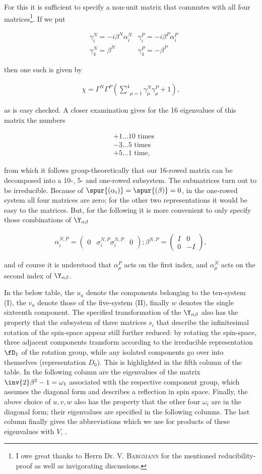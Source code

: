 \documentclass{article}
\newcommand{\uequ}[1]{
\begin{align*}
#1
\end{align*}
}
\newcommand{\sumXY}[2]{\underset{#1}{\overset{#2}{\sum}}}
\begin{document}
For this it is sufficient to specify a non-unit matrix that commutes with all four matrices\footnote{I owe great thanks to Herrn Dr. \textsc{V. Bargmann} for the mentioned reducibility-proof as well as invigorating discussions.}. If we put
\uequ{
& \gamma^N_i = -i\beta^N \alpha^N_i & \gamma^P_i = -i\beta^P\alpha^P_i\\
& \gamma^N_4 = \beta^N & \gamma^P_4 = -\beta^P
}
then one such is given by
\uequ{
\chi = \Gamma^N \Gamma^P\left(\sumXY{\mu=1}{4}{\gamma^N_\mu\gamma^P_\mu + 1}\right),
}
as is easy checked. A closer examination gives for the 16 eigenvalues of this matrix the numbers
\uequ{ 
&+1\dots 10\text{ times}\\
&-3\dots 5\text{ times}\\
&+5\dots 1\text{ time},
}
from which it follows group-theoretically that our 16-rowed matrix can be decomposed into a 10-, 5- and one-rowed subsystem. The submatrices turn out to be irreducible. Because of $\spur{(\alpha_i)} = \spur{(\beta)} = 0$, in the one-rowed system all four matrices are zero; for the other two representations it would be easy to  the matrices. But, for the following it is more convenient to only specify those combinations of $\Y_{\alpha\beta}$ 
\uequ{
\alpha^{N,P}_i = \left(\begin{matrix}
0 & \sigma^{N,P}_i
\sigma^{N,P}_i & 0
\end{matrix}
\right); \beta^{N,P} = \left(\begin{matrix}
I & 0\\
0 & -I
\end{matrix}\right),
}
and of course it is understood that $\alpha^P_\mu$ acts on the first index, and $\alpha^N_\mu$ acts on the second index of $\Y_{\alpha\beta}$.

In the below table, the $u_a$ denote the components belonging to the ten-system (I), the $v_a$ denote those of the five-system (II), finally $w$ denotes the single sixteenth component. The specified transformation of the $\Y_{\alpha\beta}$ also has the property that the subsystem of three matrices $s_i$ that describe the infinitesimal rotation of the spin-space appear still further reduced: by rotating the spin-space, three adjacent components transform according to the irreducible representation $\fD_1$ of the rotation group, while any isolated components go over into themselves (representation $D_0$). This is highlighted in the fifth column of the table. In the following column are the eigenvalues of the matrix $\inv{2}\beta^2 - 1 = \omega_1$ associated with the respective component group, which assumes the diagonal form and describes a reflection in spin space. Finally, the above choice of $u,v,w$ also has the property that the other four $\omega_i$ are in the diagonal form; their eigenvalues are specified in the following columns. The last column finally gives the abbreviations which we use for products of these eigenvalues with $V$, .
\end{document}
